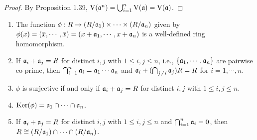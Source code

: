 \begin{proof}
    By Proposition 1.39, $\operatorname{V}(\mathfrak{a}^n) = \bigcup_{i=1}^n \operatorname{V}(\mathfrak{a}) = \operatorname{V}(\mathfrak{a})$.
\end{proof}

\begin{proposition}
    \begin{enumerate}
        \item The function $\phi: R \to (R/\mathfrak{a}_1) \times \cdots \times (R/\mathfrak{a}_n)$ given by $\phi(x) = (\overbar x, \cdots, \overbar x) = (x+\ffa_1,\cdots,x+\ffa_n)$ is a well-defined ring homomorphism.
        \item If $\mathfrak{a}_i + \mathfrak{a}_j = R$ for distinct $i,j$ with $1 \leq i,j \leq n$, i.e., $\{\mathfrak{a}_1,\cdots,\mathfrak{a}_n\}$ are pairwise co-prime, then $\bigcap_{i=1}^n \mathfrak{a}_i = \mathfrak{a}_1 \cdots \mathfrak{a}_n$ and $\mathfrak{a}_i + (\bigcap_{j \neq i} \mathfrak{a}_j)R = R$ for $i = 1,\cdots,n$.
        \item $\phi$ is surjective if and only if $\mathfrak{a}_i + \mathfrak{a}_j = R$ for distinct $i,j$ with $1 \leq i, j \leq n$.
        \item $\operatorname{Ker}(\phi) = \mathfrak{a}_1 \cap \cdots \cap \mathfrak{a}_n$.
        \item If $\mathfrak{a}_i + \mathfrak{a}_j = R$ for distinct $i,j$ with $1 \leq i,j \leq n$ and $\bigcap_{i=1}^n \mathfrak{a}_i = 0$, then $R \cong (R/\mathfrak{a}_1) \cap \cdots \cap (R/\mathfrak{a}_n)$.
    \end{enumerate}
\end{proposition}

